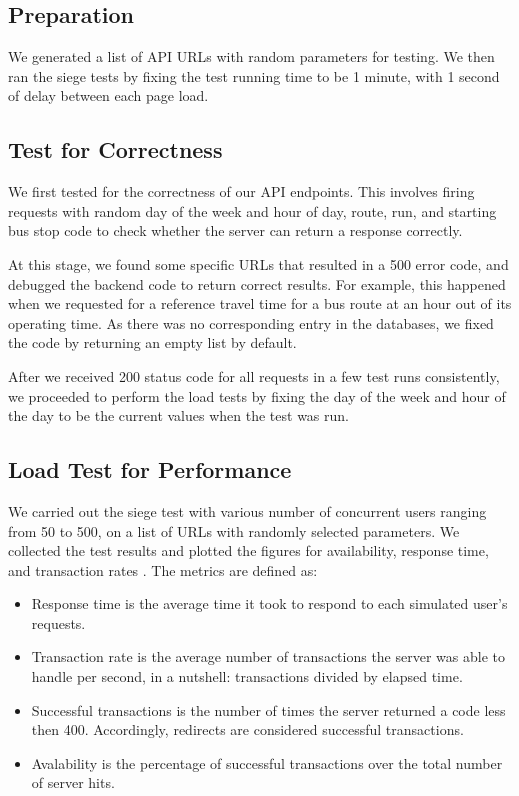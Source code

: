 \subsection{Preparation}
\par We generated a list of API URLs with random parameters for testing. We then ran the siege tests by fixing the test running time to be 1 minute, with 1 second of delay between each page load.

\subsection{Test for Correctness}
\par We first tested for the correctness of our API endpoints. This involves firing requests with random day of the week and hour of day, route, run, and starting bus stop code to check whether the server can return a response correctly.

\par At this stage, we found some specific URLs that resulted in a 500 error code, and debugged the backend code to return correct results. For example, this happened when we requested for a reference travel time for a bus route at an hour out of its operating time. As there was no corresponding entry in the databases, we fixed the code by returning an empty list by default.

\par After we received 200 status code for all requests in a few test runs consistently, we proceeded to perform the load tests by fixing the day of the week and hour of the day to be the current values when the test was run.

\subsection{Load Test for Performance}
\par We carried out the siege test with various number of concurrent users ranging from 50 to 500, on a list of URLs with randomly selected parameters. We collected the test results and plotted the figures for availability, response time, and transaction rates \cite{siege_manual}. The metrics are defined as:

\begin{itemize}
  \item Response time is the average time it took to respond to each simulated user’s requests.

  \item Transaction rate is the average number of transactions the server was able to handle per second, in a nutshell: transactions divided by elapsed time.

  \item Successful transactions is the number of times the server returned a code less then 400. Accordingly, redirects are considered successful transactions.

  \item Avalability is the percentage of successful transactions over the total number of server hits.
\end{itemize}


